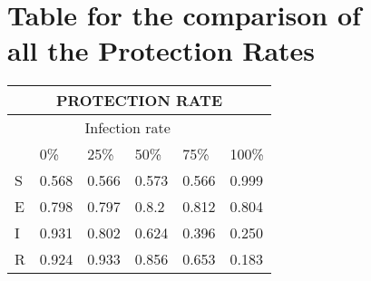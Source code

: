 \chapter{Table for the comparison of\\ all the Protection Rates}
\begin{center}
	\begin{tabularx}{\textwidth}{|X|X|X|X|X|X|}
		\hline
		\multicolumn{6}{|c|}{PROTECTION RATE} \\
		\hline
		& \multicolumn{4}{c|}{Infection rate} &  \\
		\hline
		& 0\% & 25\% & 50\% & 75\% & 100\% \\
		\hline
		S & 0.568 & 0.566 & 0.573 & 0.566 & 0.999 \\
		\hline
		E & 0.798 & 0.797 & 0.8.2 & 0.812 & 0.804 \\
		\hline
		I & 0.931 & 0.802 & 0.624 & 0.396 & 0.250 \\
		\hline
		R & 0.924 & 0.933 & 0.856 & 0.653 & 0.183 \\
		\hline
	\end{tabularx}
\end{center}
